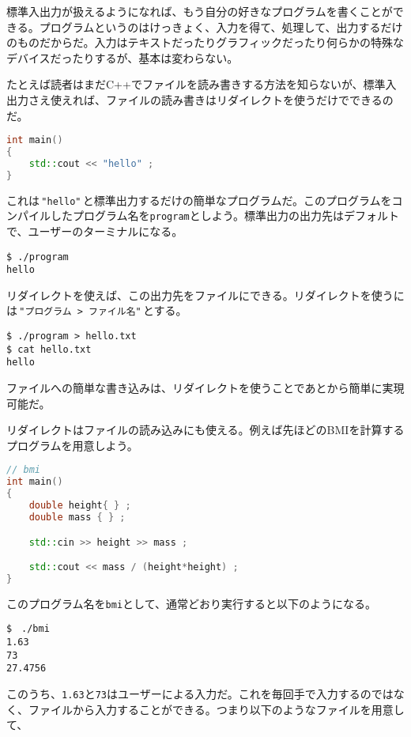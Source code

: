 標準入出力が扱えるようになれば、もう自分の好きなプログラムを書くことができる。プログラムというのはけっきょく、入力を得て、処理して、出力するだけのものだからだ。入力はテキストだったりグラフィックだったり何らかの特殊なデバイスだったりするが、基本は変わらない。

たとえば読者はまだC++でファイルを読み書きする方法を知らないが、標準入出力さえ使えれば、ファイルの読み書きはリダイレクトを使うだけでできるのだ。

\begin{lstlisting}[language={C++}]
int main()
{
    std::cout << "hello" ;
}
\end{lstlisting}

これは\,\texttt{"hello"}\,と標準出力するだけの簡単なプログラムだ。このプログラムをコンパイルしたプログラム名を\texttt{program}としよう。標準出力の出力先はデフォルトで、ユーザーのターミナルになる。

\begin{lstlisting}[style=terminal]
$ ./program
hello
\end{lstlisting}

リダイレクトを使えば、この出力先をファイルにできる。リダイレクトを使うには\,\texttt{"プログラム > ファイル名"}\,とする。

\begin{lstlisting}[style=terminal]
$ ./program > hello.txt
$ cat hello.txt
hello
\end{lstlisting}

ファイルへの簡単な書き込みは、リダイレクトを使うことであとから簡単に実現可能だ。

リダイレクトはファイルの読み込みにも使える。例えば先ほどのBMIを計算するプログラムを用意しよう。

\begin{lstlisting}[language={C++}]
// bmi
int main()
{
    double height{ } ;
    double mass { } ;

    std::cin >> height >> mass ;

    std::cout << mass / (height*height) ;
}
\end{lstlisting}

このプログラム名を\texttt{bmi}として、通常どおり実行すると以下のようになる。

\begin{lstlisting}[style=terminal]
$　./bmi
1.63
73
27.4756
\end{lstlisting}

このうち、\texttt{1.63}と\texttt{73}はユーザーによる入力だ。これを毎回手で入力するのではなく、ファイルから入力することができる。つまり以下のようなファイルを用意して、

